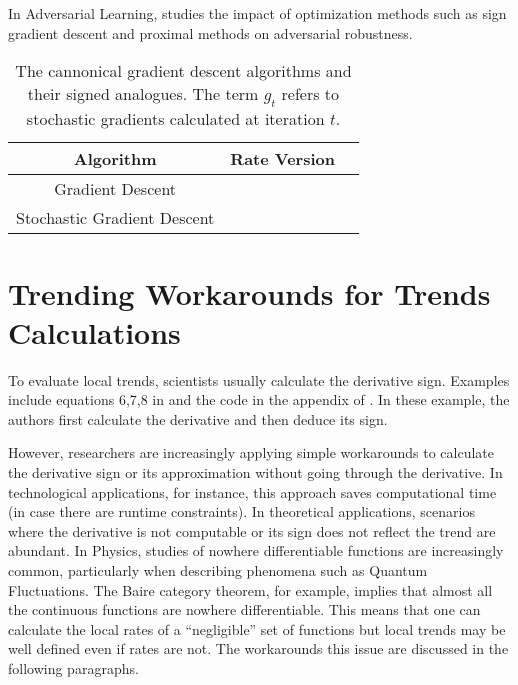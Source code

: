 \documentclass[11pt]{book}
\begin{document}
In Adversarial Learning, \cite{faghri2021bridging} studies the impact
of optimization methods such as sign gradient descent and proximal
methods on adversarial robustness.

\begin{table}[H]
\centering %
\begin{tabular}{ccc}
\toprule 
\textbf{Algorithm} & \color[HTML]{FFA006} {\textbf{Rate Version}} & \color[HTML]{0039BD}{\textbf{Trend Version}}\tabularnewline
\midrule 
Gradient Descent & \color[HTML]{FFA006}{$x_{t+1}=x_{t}-\alpha_{t}\nabla f_{t}$} & \color[HTML]{0039BD}{$x_{t+1}=x_{t}-\alpha_{t}\text{sgn}\left(\nabla f_{t}\right)$}\tabularnewline
Stochastic Gradient Descent & \color[HTML]{FFA006}{$x_{t+1}=x_{t}-\alpha_{t}g_{t}$} & \color[HTML]{0039BD}{$x_{t+1}=x_{t}-\alpha_{t}\text{sgn}\left(g_{t}\right)$}\tabularnewline
\bottomrule
\end{tabular}\caption{The cannonical gradient descent algorithms and their signed analogues.
The term $g_{t}$ refers to stochastic gradients calculated at iteration
$t$.}
\end{table}


\chapter{Trending Workarounds for Trends Calculations}

To evaluate local trends, scientists usually calculate the derivative
sign. Examples include equations 6,7,8 in \cite{meddah2019fpga} and
the code in the appendix of \cite{alfarra2021combating}. In these example, the authors first
calculate the derivative and then deduce its sign.

However, researchers are increasingly applying simple workarounds to calculate
the derivative sign or its approximation without going through the
derivative. In technological applications, for instance, this approach saves computational
time (in case there are runtime constraints). In theoretical applications,
scenarios where the derivative is not computable or its sign does
not reflect the trend are abundant. In Physics, studies of nowhere differentiable functions are increasingly common, particularly
when describing phenomena such as Quantum Fluctuations. The Baire category theorem, for example, implies that almost all the continuous
functions are nowhere differentiable. This means that one can calculate
the local rates of a ``negligible'' set of functions but local
trends may be well defined even if rates are not. The workarounds this issue are discussed in the following paragraphs.
\end{document}
